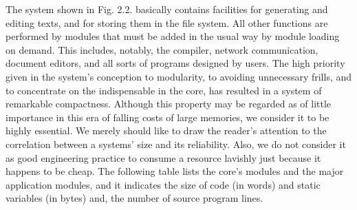 The system shown in Fig. 2.2. basically contains facilities for
generating and editing texts, and for storing them in the file
system. All other functions are performed by modules that must be
added in the usual way by module loading on demand. This includes,
notably, the compiler, network communication, document editors, and
all sorts of programs designed by users. The high priority given in
the system's conception to modularity, to avoiding unnecessary frills,
and to concentrate on the indispensable in the core, has resulted in a
system of remarkable compactness. Although this property may be
regarded as of little importance in this era of falling costs of large
memories, we consider it to be highly essential. We merely should like
to draw the reader's attention to the correlation between a systems'
size and its reliability. Also, we do not consider it as good
engineering practice to consume a resource lavishly just because it
happens to be cheap. The following table lists the core's modules and
the major application modules, and it indicates the size of code (in
words) and static variables (in bytes) and, the number of source
program lines.
\medskip
{}

